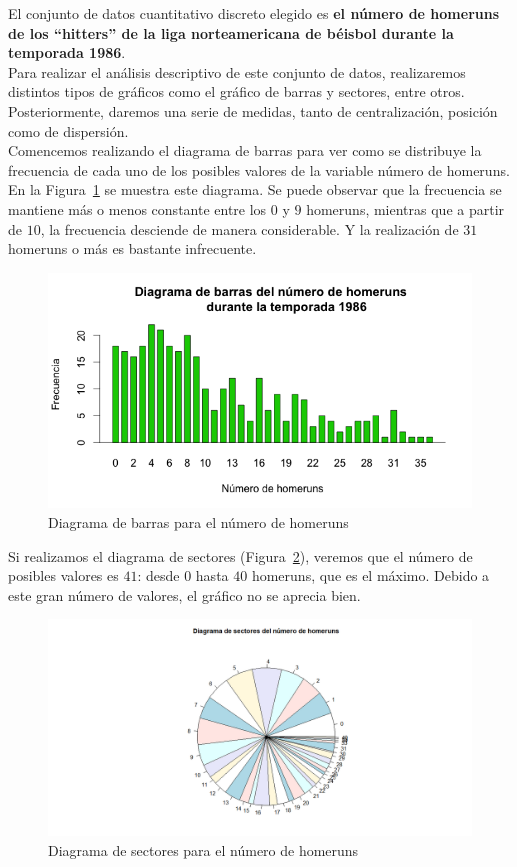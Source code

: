 \documentclass[12pt,a4paper,twoside,openright,titlepage,final]{article}
\begin{document}
El conjunto de datos cuantitativo discreto elegido es \textbf{el número de homeruns de los ``hitters'' de la liga norteamericana de béisbol durante la temporada 1986}.\\

Para realizar el análisis descriptivo de este conjunto de datos, realizaremos distintos tipos de gráficos como el gráfico de barras y sectores, entre otros. Posteriormente, daremos una serie de medidas, tanto de centralización, posición como de dispersión.\\

Comencemos realizando el diagrama de barras para ver como se distribuye la frecuencia de cada uno de los posibles valores de la variable número de homeruns. En la Figura~\ref{fig:diagrama_barras_homeruns} se muestra este diagrama. Se puede observar que la frecuencia se mantiene más o menos constante entre los $0$ y $9$ homeruns, mientras que a partir de $10$, la frecuencia desciende de manera considerable. Y la realización de $31$ homeruns o más es bastante infrecuente.\\

\begin{figure}[tbph!]
\centering
\includegraphics[width=0.8\linewidth]{imagenes/diagrama_barras_homeruns}
\caption{Diagrama de barras para el número de homeruns}
\label{fig:diagrama_barras_homeruns}
\end{figure}

Si realizamos el diagrama de sectores (Figura~\ref{fig:diagrama_sector_homeruns}), veremos que el número de posibles valores es $41$: desde $0$ hasta $40$ homeruns, que es el máximo. Debido a este gran número de valores, el gráfico no se aprecia bien.\\

\begin{figure}[tbph!]
\centering
\includegraphics[width=\linewidth]{imagenes/diagrama_sectores_homeruns}
\caption{Diagrama de sectores para el número de homeruns}
\label{fig:diagrama_sector_homeruns}
\end{figure}
\end{document}
